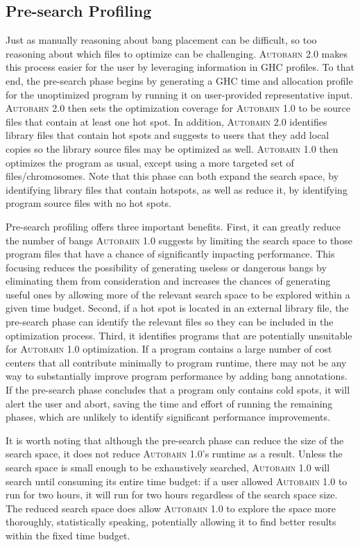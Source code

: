 \documentclass[format=sigplan, review=true]{acmart}
\newcommand{\hotspot}[0]{hot spot}
\newcommand{\hotspots}[0]{hot spots}
\newcommand{\coldspots}[0]{cold spots}
\newcommand{\dangerous}[0]{dangerous}
\newcommand{\useful}[0]{useful}
\newcommand{\useless}[0]{useless}
\newcommand{\Ao}[0]{\textsc{Autobahn 1.0}}
\newcommand{\At}[0]{\textsc{Autobahn 2.0}}
\newcommand{\preopt}[0]{pre-search}
\newcommand{\Preopt}[0]{Pre-search}
\begin{document}
\subsection{\Preopt{} Profiling}

Just as manually reasoning about bang placement can be difficult, 
so too reasoning about which files to optimize can be challenging.
\At{} makes this process easier for the user by leveraging information
in GHC profiles.  
To that end, the \preopt{} phase begins by generating a GHC time
and allocation profile for the unoptimized program by running it on 
user-provided representative input.
\At{} then sets the optimization coverage
for \Ao{} to be source files that contain at least one \hotspot{}. 
In addition, 
\At{} identifies library files that contain \hotspots{} and
suggests to users that they add local copies so the library source
files may be optimized as well. 
\Ao{} then optimizes the program as usual, except using a more
targeted set of files/chromosomes.
Note that this phase can both expand the search space, by identifying
library files that contain hotspots, as well as reduce it, by
identifying program source files with no \hotspots{}. 

\Preopt{} profiling offers three important benefits.
First, it can greatly reduce the number of bangs \Ao{} suggests by
limiting the search space to those program files that have a chance of
significantly impacting performance. This focusing reduces the
possibility of generating \useless{} or \dangerous{} bangs by
eliminating them from consideration
and
increases the chances of generating \useful{} ones by allowing more of
the relevant search space to be explored within a given time budget.
Second, if a \hotspot{} is located in an external library file,
the \preopt{} phase can identify the relevant files so they can be
included in the optimization process. 
Third, it identifies programs that are potentially unsuitable for
\Ao{} optimization. If a program contains a large number of cost
centers that all contribute minimally to program runtime, there may
not be any way to substantially improve program performance by adding
bang annotations. If the \preopt{} phase concludes that
a program only contains \coldspots{}, it will alert the user and
abort, saving the time and effort of running the remaining phases, 
which are unlikely to identify significant performance improvements.


It is worth noting that although the \preopt{} phase can reduce the
size of the search space, it does not reduce \Ao{}'s runtime as a
result. Unless the search space is small enough to be exhaustively
searched, \Ao{} will search until consuming its entire time budget:
if a user allowed \Ao{} to run for two hours, it
will run for two hours regardless of the search space
size. The reduced search space does allow \Ao{} to explore the space
more thoroughly, statistically speaking, potentially allowing it to 
find better results within the fixed time budget.
\end{document}
